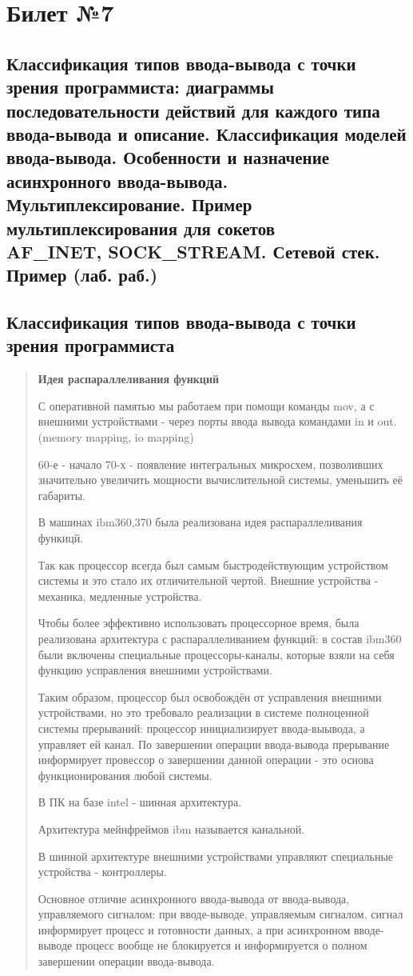 \chapter{Билет №7}

\section*{Классификация типов ввода-вывода с точки зрения программиста: диаграммы последовательности действий для каждого типа ввода-вывода и описание. Классификация моделей ввода-вывода. Особенности и назначение асинхронного ввода-вывода. Мультиплексирование. Пример мультиплексирования для сокетов \\AF\_INET, SOCK\_STREAM. Сетевой стек. Пример (лаб. раб.)}

\section{Классификация типов ввода-вывода с точки зрения программиста}
\begin{quote}
\textbf{Идея распараллеливания функций}

С оперативной памятью мы работаем при помощи команды mov, а с внешними устройствами - через порты ввода вывода командами in и out. (memory mapping, io mapping)

60-е - начало 70-х - появление интегральных микросхем, позволивших значительно увеличить мощности вычислительной системы, уменьшить её габариты.

В машинах ibm360,370 была реализована идея распараллеливания функицй.

Так как процессор всегда был самым быстродействующим устройством системы и это стало их отличительной чертой. Внешние устройства - механика, медленные устройства.

Чтобы более эффективно использовать процессорное время, была реализована архитектура с распараллеливанием функций: в состав ibm360 были включены специальные процессоры-каналы, которые взяли на себя функцию усправления внешними устройствами.

Таким образом, процессор был освобождён от усправления внешними устройствами, но это требовало реализации в системе полноценной системы прерываний: процессор инициализирует ввода-выывода, а управляет ей канал. По завершении операции ввода-вывода прерывание информирует провессор о завершении данной операции - это основа функционирования любой системы.

В ПК на базе intel - шинная архитектура.

Архитектура мейнфреймов ibm называется канальной.

В шинной архитектуре внешними устройствами управляют специальные устройства - контроллеры.

Основное отличие асинхронного ввода-вывода от ввода-вывода, управляемого сигналом: при вводе-выводе, управляемым сигналом, сигнал информирует процесс и готовности данных, а при асинхронном вводе-выводе процесс вообще не блокируется и информируется о полном завершении операции ввода-вывода.
\end{quote}
